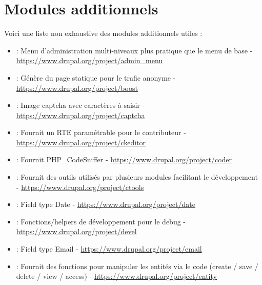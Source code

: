 \documentclass[a4paper,11pt,french]{rtdsphinxmanual}
\begin{document}
\section{Modules additionnels}
\label{modules:modules-additionnels}
Voici une liste non exhaustive des modules additionnels utiles :
\begin{itemize}
\item {} 
 : Menu d'administration multi-niveaux plus pratique que le menu de base - \href{https://www.drupal.org/project/admin\_menu}{https://www.drupal.org/project/admin\_menu}

\item {} 
 : Génère du page statique pour le trafic anonyme - \href{https://www.drupal.org/project/boost}{https://www.drupal.org/project/boost}

\item {} 
 : Image captcha avec caractères à saisir - \href{https://www.drupal.org/project/captcha}{https://www.drupal.org/project/captcha}

\item {} 
 : Fournit un RTE paramétrable pour le contributeur - \href{https://www.drupal.org/project/ckeditor}{https://www.drupal.org/project/ckeditor}

\item {} 
 : Fournit PHP\_CodeSniffer - \href{https://www.drupal.org/project/coder}{https://www.drupal.org/project/coder}

\item {} 
 : Fournit des outils utilisés par plusieurs modules facilitant le développement - \href{https://www.drupal.org/project/ctools}{https://www.drupal.org/project/ctools}

\item {} 
 : Field type Date - \href{https://www.drupal.org/project/date}{https://www.drupal.org/project/date}

\item {} 
 : Fonctions/helpers de développement pour le debug - \href{https://www.drupal.org/project/devel}{https://www.drupal.org/project/devel}

\item {} 
 : Field type Email - \href{https://www.drupal.org/project/email}{https://www.drupal.org/project/email}

\item {} 
 : Fournit des fonctions pour manipuler les entités via le code (create / save / delete / view / access) - \href{https://www.drupal.org/project/entity}{https://www.drupal.org/project/entity}


\end{itemize}
\end{document}
